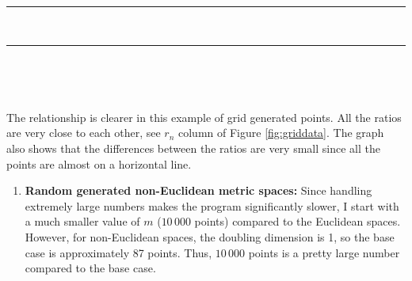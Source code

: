 \documentclass[12pt,english,]{article}
\providecommand{\tightlist}{%
  \setlength{\itemsep}{0pt}\setlength{\parskip}{0pt}}
\let\origfigure\figure
\let\endorigfigure\endfigure
\renewenvironment{figure}[1][2] {
    \expandafter\origfigure\expandafter[H]
} {
    \endorigfigure
}
\begin{document}
\hrule

~

\begin{figure}
\begin{minipage}{0.95\textwidth}
\begin{center}
\end{center}
\end{minipage}
\caption[Caption]{The graph of ratios $r_n$ versus different values of $n$ of grid points with $n \in \{200\,000, 400\,000, 800\,000, 1\,600\,000, 3\,200\,000\}$ (with y-interval = $10^{-3}$).}
\label{fig:gridgraph}
\end{figure}

\hrule

~

~

The relationship is clearer in this example of grid generated points.
All the ratios are very close to each other, see \(r_n\) column of
Figure \ref{fig:griddata}. The graph also shows that the differences
between the ratios are very small since all the points are almost on a
horizontal line.

\begin{enumerate}
\def\labelenumi{\arabic{enumi}.}
\setcounter{enumi}{2}
\tightlist
\item
  \textbf{Random generated non-Euclidean metric spaces:} Since handling
  extremely large numbers makes the program significantly slower, I
  start with a much smaller value of \(m\) (\(10\,000\) points) compared
  to the Euclidean spaces. However, for non-Euclidean spaces, the
  doubling dimension is 1, so the base case is approximately 87 points.
  Thus, \(10\,000\) points is a pretty large number compared to the base
  case.
\end{enumerate}
\end{document}
